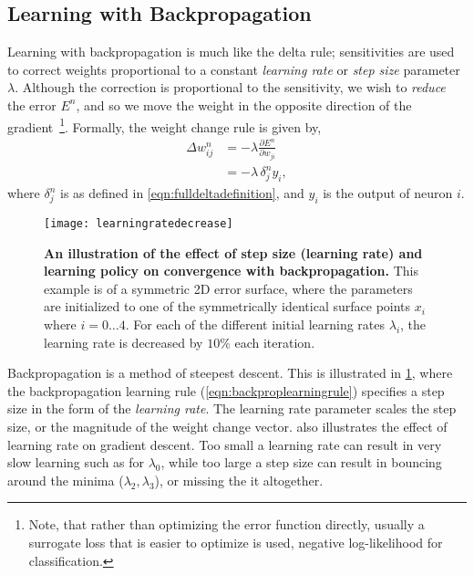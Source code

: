 \documentclass[thesis]{subfiles}
\begin{document}
\subsection{Learning with Backpropagation}
Learning with backpropagation is much like the delta rule; sensitivities are used to correct weights proportional to a constant \emph{learning rate} or \emph{step size} parameter $\lambda$. Although the correction is proportional to the sensitivity, we wish to \emph{reduce} the error $E^n$, and so we move the weight in the opposite direction of the gradient~\footnote{Note, that rather than optimizing the error function directly, usually a surrogate loss that is easier to optimize is used, \ie negative log-likelihood for classification.}. Formally, the weight change rule is given by,
\begin{equation}
\begin{aligned}
    \Delta w^n_{ij} &= -\lambda \frac{\partial E^n}{\partial w_{ji}}\\
    &= -\lambda \, \delta^n_j y_i,
     \label{eqn:backproplearningrule}
\end{aligned}
\end{equation}
where $\delta^n_j$ is as defined in \cref{eqn:fulldeltadefinition}, and $y_i$ is the output of neuron $i$.

\begin{figure}[tbp]
\centering
\texttt{[image: learningratedecrease]}
\caption[Learning rate and convergence.]{\textbf{An illustration of the effect of step size (learning rate) and learning policy on convergence with backpropagation.} This example is of a symmetric 2D error surface, where the parameters are initialized to one of the symmetrically identical surface points $x_i$ where $i=0\ldots4$. For each of the different initial learning rates $\lambda_i$, the learning rate is decreased by $10\%$ each iteration.}\label{fig:learningrate}
\end{figure}
Backpropagation is a method of steepest descent. This is illustrated in \cref{fig:learningrate}, where the backpropagation learning rule (\cref{eqn:backproplearningrule}) specifies a step size in the form of the \emph{learning rate}. The learning rate parameter scales the step size, or the magnitude of the weight change vector.  also illustrates the effect of learning rate on gradient descent. Too small a learning rate can result in very slow learning such as for $\lambda_0$, while too large a step size can result in bouncing around the minima ($\lambda_2, \lambda_3$), or missing the it altogether. 
\end{document}
